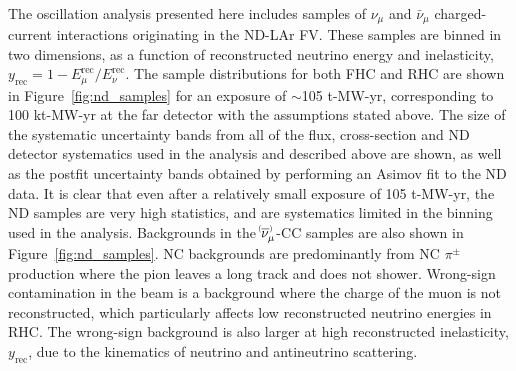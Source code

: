 \begin{figure*}
  \centering
  \\
  \caption{ND samples in both FHC and RHC, shown in the reconstructed neutrino energy and reconstructed inelasticity binning ($y_{\mathrm{rec}}$) used in the analysis, shown for a $\sim$105 t-MW-yr exposure (equivalent to a 100 kt-MW-yr exposure at the FD), with an equal split between FHC and RHC. The size of the systematic uncertainty bands from all of the flux, cross-section and ND detector systematics used in the analysis are shown, as well as the postfit uncertainty bands obtained by performing an Asimov fit to the ND data. Background are also shown, which are dominated by NC events, although there is some contribution from wrong-sign \numu background events in RHC. Note that statistical uncertainties are too small to be visible on this plot scale.}
 \label{fig:nd_samples}
\end{figure*}
The oscillation analysis presented here includes samples of $\nu_{\mu}$ and $\bar{\nu}_{\mu}$ charged-current interactions originating in the ND-LAr FV. These samples are binned in two dimensions, as a function of reconstructed neutrino energy and inelasticity, $y_{\mathrm{rec}} = 1 - E^{\mathrm{rec}}_{\mu}/E^{\mathrm{rec}}_{\nu}$. The sample distributions for both FHC and RHC are shown in Figure~\ref{fig:nd_samples} for an exposure of $\sim$105 t-MW-yr, corresponding to 100 kt-MW-yr at the far detector with the assumptions stated above. The size of the systematic uncertainty bands from all of the flux, cross-section and ND detector systematics used in the analysis and described above are shown, as well as the postfit uncertainty bands obtained by performing an Asimov fit to the ND data. It is clear that even after a relatively small exposure of 105 t-MW-yr, the ND samples are very high statistics, and are systematics limited in the binning used in the analysis. Backgrounds in the $\nu^{\bracketbar}_{\mu}$-CC samples are also shown in Figure~\ref{fig:nd_samples}. NC backgrounds are predominantly from NC $\pi^{\pm}$ production where the pion leaves a long track and does not shower. Wrong-sign contamination in the beam is a background where the charge of the muon is not reconstructed, which particularly affects low reconstructed neutrino energies in RHC. The wrong-sign background is also larger at high reconstructed inelasticity, $y_{\mathrm{rec}}$, due to the kinematics of neutrino and antineutrino scattering.

